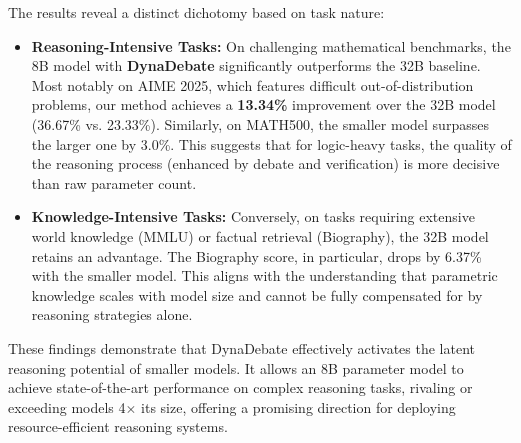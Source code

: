The results reveal a distinct dichotomy based on task nature:
\begin{itemize}
    \item \textbf{Reasoning-Intensive Tasks:} On challenging mathematical benchmarks, the 8B model with \textbf{DynaDebate} significantly outperforms the 32B baseline. Most notably on AIME 2025, which features difficult out-of-distribution problems, our method achieves a \textbf{13.34\%} improvement over the 32B model (36.67\% vs. 23.33\%). Similarly, on MATH500, the smaller model surpasses the larger one by 3.0\%. This suggests that for logic-heavy tasks, the quality of the reasoning process (enhanced by debate and verification) is more decisive than raw parameter count.

    \item \textbf{Knowledge-Intensive Tasks:} Conversely, on tasks requiring extensive world knowledge (MMLU) or factual retrieval (Biography), the 32B model retains an advantage. The Biography score, in particular, drops by 6.37\% with the smaller model. This aligns with the understanding that parametric knowledge scales with model size and cannot be fully compensated for by reasoning strategies alone.
\end{itemize}

These findings demonstrate that DynaDebate effectively activates the latent reasoning potential of smaller models. It allows an 8B parameter model to achieve state-of-the-art performance on complex reasoning tasks, rivaling or exceeding models 4$\times$ its size, offering a promising direction for deploying resource-efficient reasoning systems.
